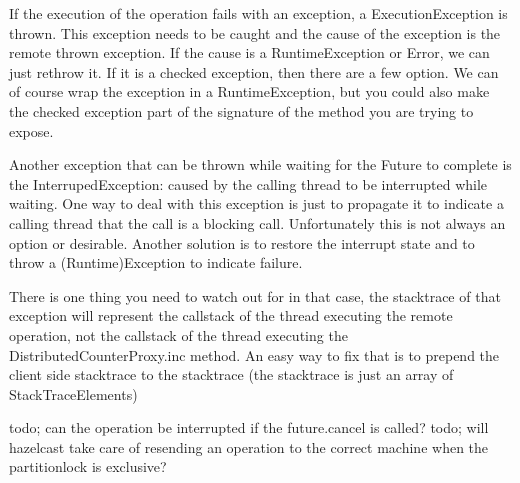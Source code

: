 If the execution of the operation fails with an exception, a ExecutionException is thrown. This exception needs to be caught and the cause of the exception is the remote thrown exception. If the cause is a RuntimeException or Error, we can just rethrow it. If it is a checked exception, then there are a few option. We can of course wrap the exception in a RuntimeException, but you could also make the checked exception part of the signature of the method you are trying to expose. 

Another exception that can be thrown while waiting for the Future to complete is the InterrupedException: caused by the calling thread to be interrupted while waiting. One way to deal with this exception is just to propagate it to indicate a calling thread that the call is a blocking call. Unfortunately this is not always an option or desirable. Another solution is to restore the interrupt state and to throw a (Runtime)Exception to indicate failure. 

There is one thing you need to watch out for in that case, the stacktrace of that exception will represent the callstack of the thread executing the remote operation, not the callstack of the thread executing the DistributedCounterProxy.inc method. An easy way to fix that is to prepend the client side stacktrace to the stacktrace (the stacktrace is just an array of StackTraceElements)

todo; can the operation be interrupted if the future.cancel is called?
todo; will hazelcast take care of resending an operation to the correct machine when the partitionlock is exclusive?

